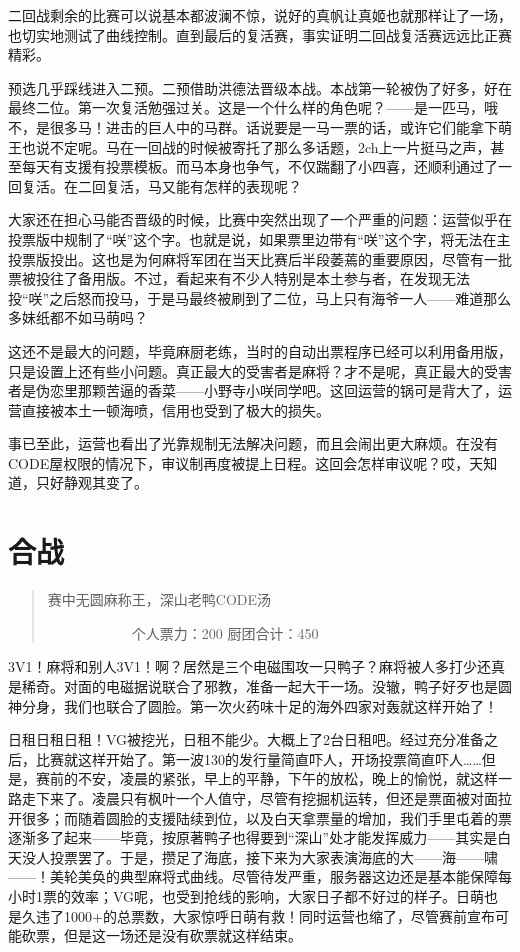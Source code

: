 二回战剩余的比赛可以说基本都波澜不惊，说好的真帆让真姬也就那样让了一场，也切实地测试了曲线控制。直到最后的复活赛，事实证明二回战复活赛远远比正赛精彩。

预选几乎踩线进入二预。二预借助洪德法晋级本战。本战第一轮被伪了好多，好在最终二位。第一次复活勉强过关。这是一个什么样的角色呢？——是一匹马，哦不，是很多马！进击的巨人中的马群。话说要是一马一票的话，或许它们能拿下萌王也说不定呢。马在一回战的时候被寄托了那么多话题，2ch上一片挺马之声，甚至每天有支援有投票模板。而马本身也争气，不仅踹翻了小四喜，还顺利通过了一回复活。在二回复活，马又能有怎样的表现呢？

大家还在担心马能否晋级的时候，比赛中突然出现了一个严重的问题：运营似乎在投票版中规制了“咲”这个字。也就是说，如果票里边带有“咲”这个字，将无法在主投票版投出。这也是为何麻将军团在当天比赛后半段萎蔫的重要原因，尽管有一批票被投往了备用版。不过，看起来有不少人特别是本土参与者，在发现无法投“咲”之后怒而投马，于是马最终被刷到了二位，马上只有海爷一人——难道那么多妹纸都不如马萌吗？

这还不是最大的问题，毕竟麻厨老练，当时的自动出票程序已经可以利用备用版，只是设置上还有些小问题。真正最大的受害者是麻将？才不是呢，真正最大的受害者是伪恋里那颗苦逼的香菜——小野寺小咲同学吧。这回运营的锅可是背大了，运营直接被本土一顿海喷，信用也受到了极大的损失。

事已至此，运营也看出了光靠规制无法解决问题，而且会闹出更大麻烦。在没有CODE屋权限的情况下，审议制再度被提上日程。这回会怎样审议呢？哎，天知道，只好静观其变了。


\chapter{合战}
\begin{quote}
赛中无圆麻称王，深山老鸭CODE汤

　　　　　　个人票力：200 厨团合计：450
\end{quote}

3V1！麻将和别人3V1！啊？居然是三个电磁围攻一只鸭子？麻将被人多打少还真是稀奇。对面的电磁据说联合了邪教，准备一起大干一场。没辙，鸭子好歹也是圆神分身，我们也联合了圆脸。第一次火药味十足的海外四家对轰就这样开始了！

日租日租日租！VG被挖光，日租不能少。大概上了2台日租吧。经过充分准备之后，比赛就这样开始了。第一波130的发行量简直吓人，开场投票简直吓人……但是，赛前的不安，凌晨的紧张，早上的平静，下午的放松，晚上的愉悦，就这样一路走下来了。凌晨只有枫叶一个人值守，尽管有挖掘机运转，但还是票面被对面拉开很多；而随着圆脸的支援陆续到位，以及白天拿票量的增加，我们手里屯着的票逐渐多了起来——毕竟，按原著鸭子也得要到“深山”处才能发挥威力——其实是白天没人投票罢了。于是，攒足了海底，接下来为大家表演海底的大——海——啸——！美轮美奂的典型麻将式曲线。尽管待发严重，服务器这边还是基本能保障每小时1票的效率；VG呢，也受到抢线的影响，大家日子都不好过的样子。日萌也是久违了1000+的总票数，大家惊呼日萌有救！同时运营也缩了，尽管赛前宣布可能砍票，但是这一场还是没有砍票就这样结束。

